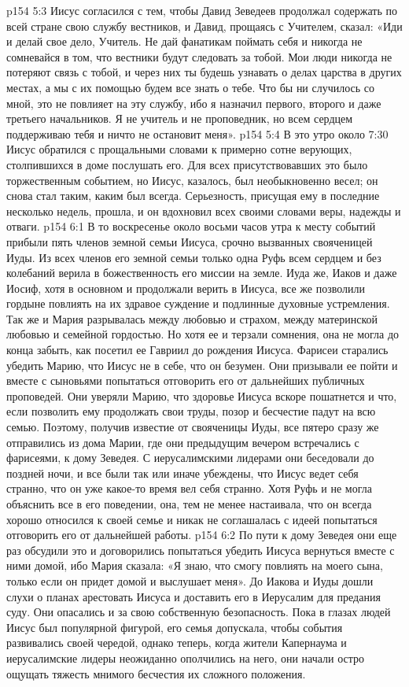 \vs p154 5:3 Иисус согласился с тем, чтобы Давид Зеведеев продолжал содержать по всей стране свою службу вестников, и Давид, прощаясь с Учителем, сказал: «Иди и делай свое дело, Учитель. Не дай фанатикам поймать себя и никогда не сомневайся в том, что вестники будут следовать за тобой. Мои люди никогда не потеряют связь с тобой, и через них ты будешь узнавать о делах царства в других местах, а мы с их помощью будем все знать о тебе. Что бы ни случилось со мной, это не повлияет на эту службу, ибо я назначил первого, второго и даже третьего начальников. Я не учитель и не проповедник, но всем сердцем поддерживаю тебя и ничто не остановит меня».
\vs p154 5:4 В это утро около 7:30 Иисус обратился с прощальными словами к примерно сотне верующих, столпившихся в доме послушать его. Для всех присутствовавших это было торжественным событием, но Иисус, казалось, был необыкновенно весел; он снова стал таким, каким был всегда. Серьезность, присущая ему в последние несколько недель, прошла, и он вдохновил всех своими словами веры, надежды и отваги.
\vs p154 6:1 В то воскресенье около восьми часов утра к месту событий прибыли пять членов земной семьи Иисуса, срочно вызванных свояченицей Иуды. Из всех членов его земной семьи только одна Руфь всем сердцем и без колебаний верила в божественность его миссии на земле. Иуда же, Иаков и даже Иосиф, хотя в основном и продолжали верить в Иисуса, все же позволили гордыне повлиять на их здравое суждение и подлинные духовные устремления. Так же и Мария разрывалась между любовью и страхом, между материнской любовью и семейной гордостью. Но хотя ее и терзали сомнения, она не могла до конца забыть, как посетил ее Гавриил до рождения Иисуса. Фарисеи старались убедить Марию, что Иисус не в себе, что он безумен. Они призывали ее пойти и вместе с сыновьями попытаться отговорить его от дальнейших публичных проповедей. Они уверяли Марию, что здоровье Иисуса вскоре пошатнется и что, если позволить ему продолжать свои труды, позор и бесчестие падут на всю семью. Поэтому, получив известие от свояченицы Иуды, все пятеро сразу же отправились из дома Марии, где они предыдущим вечером встречались с фарисеями, к дому Зеведея. С иерусалимскими лидерами они беседовали до поздней ночи, и все были так или иначе убеждены, что Иисус ведет себя странно, что он уже какое\hyp{}то время вел себя странно. Хотя Руфь и не могла объяснить все в его поведении, она, тем не менее настаивала, что он всегда хорошо относился к своей семье и никак не соглашалась с идеей попытаться отговорить его от дальнейшей работы.
\vs p154 6:2 По пути к дому Зеведея они еще раз обсудили это и договорились попытаться убедить Иисуса вернуться вместе с ними домой, ибо Мария сказала: «Я знаю, что смогу повлиять на моего сына, только если он придет домой и выслушает меня». До Иакова и Иуды дошли слухи о планах арестовать Иисуса и доставить его в Иерусалим для предания суду. Они опасались и за свою собственную безопасность. Пока в глазах людей Иисус был популярной фигурой, его семья допускала, чтобы события развивались своей чередой, однако теперь, когда жители Капернаума и иерусалимские лидеры неожиданно ополчились на него, они начали остро ощущать тяжесть мнимого бесчестия их сложного положения.
